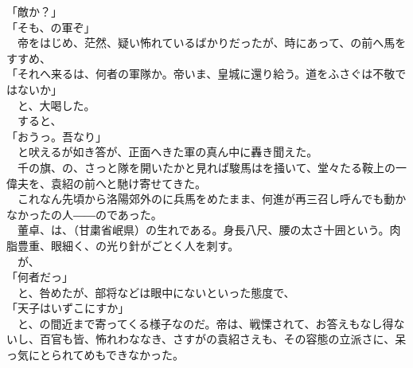 \documentclass[
  paper=a5,
  fontsize=10pt,
  jafontsize=9.5pt,
  tate,                  %
  open_bracket_pos=nibu, %
]{jlreq}
\begin{document}
「敵か？」\\


「そも、の軍ぞ」\\


　帝をはじめ、茫然、疑い怖れているばかりだったが、時にあって、の前へ馬をすすめ、\\


「それへ来るは、何者の軍隊か。帝いま、皇城に還り給う。道をふさぐは不敬ではないか」\\


　と、大喝した。\\


　すると、\\


「おうっ。吾なり」\\


　と吠えるが如き答が、正面へきた軍の真ん中に轟き聞えた。\\


　千の旗、の、さっと隊を開いたかと見れば駿馬はを掻いて、堂々たる鞍上の一偉夫を、袁紹の前へと馳け寄せてきた。\\


　これなん先頃から洛陽郊外のに兵馬をめたまま、何進が再三召し呼んでも動かなかったの人――のであった。\\


　董卓、は、（甘粛省岷県）の生れである。身長八尺、腰の太さ十囲という。肉脂豊重、眼細く、の光り針がごとく人を刺す。\\


　が、\\


「何者だっ」\\


　と、咎めたが、部将などは眼中にないといった態度で、\\


「天子はいずこにすか」\\


　と、の間近まで寄ってくる様子なのだ。帝は、戦慄されて、お答えもなし得ないし、百官も皆、怖れわななき、さすがの袁紹さえも、その容態の立派さに、呆っ気にとられてめもできなかった。\\
\end{document}
